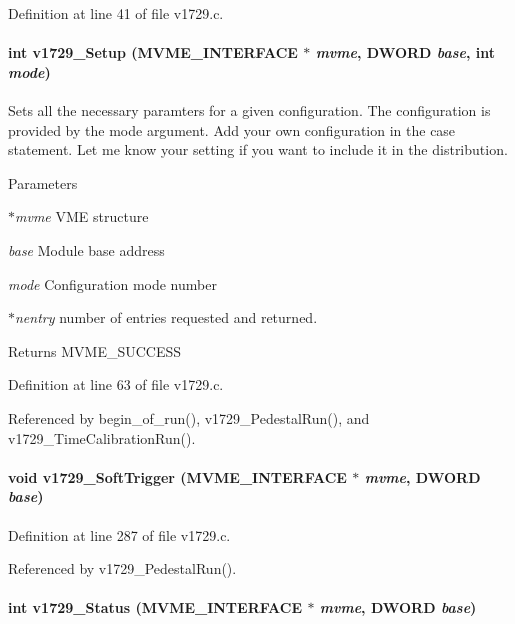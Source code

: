 Definition at line 41 of file v1729.c.
\paragraph[{v1729\_\-Setup}]{\setlength{\rightskip}{0pt plus 5cm}int v1729\_\-Setup ({\bf MVME\_\-INTERFACE} $\ast$ {\em mvme}, \/  {\bf DWORD} {\em base}, \/  int {\em mode})}\hfill\label{v1729_8c_a16a8a323c157ed043a86ac69a6ada37d}
Sets all the necessary paramters for a given configuration. The configuration is provided by the mode argument. Add your own configuration in the case statement. Let me know your setting if you want to include it in the distribution. 
\begin{DoxyParams}{Parameters}
\item[{\em $\ast$mvme}]VME structure \item[{\em base}]Module base address \item[{\em mode}]Configuration mode number \item[{\em $\ast$nentry}]number of entries requested and returned. \end{DoxyParams}
\begin{DoxyReturn}{Returns}
MVME\_\-SUCCESS 
\end{DoxyReturn}


Definition at line 63 of file v1729.c.

Referenced by begin\_\-of\_\-run(), v1729\_\-PedestalRun(), and v1729\_\-TimeCalibrationRun().
\paragraph[{v1729\_\-SoftTrigger}]{\setlength{\rightskip}{0pt plus 5cm}void v1729\_\-SoftTrigger ({\bf MVME\_\-INTERFACE} $\ast$ {\em mvme}, \/  {\bf DWORD} {\em base})}\hfill\label{v1729_8c_aabf534ea5032d992b1c5a823939f37b0}


Definition at line 287 of file v1729.c.

Referenced by v1729\_\-PedestalRun().
\paragraph[{v1729\_\-Status}]{\setlength{\rightskip}{0pt plus 5cm}int v1729\_\-Status ({\bf MVME\_\-INTERFACE} $\ast$ {\em mvme}, \/  {\bf DWORD} {\em base})}\hfill\label{v1729_8c_a6025f9ff1237562264e91f22ca834fb7}


